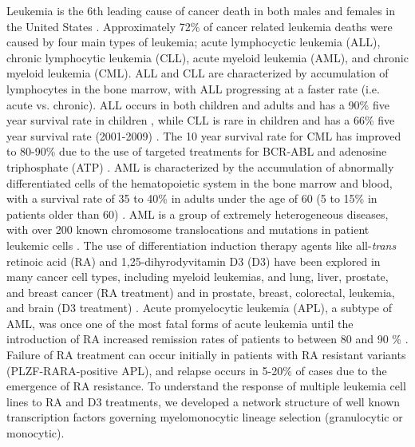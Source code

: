 \documentclass[12pt]{article}
\begin{document}
Leukemia is the 6th leading cause of cancer death in both males and females in the United States \cite{Siegel2015}. Approximately 72\% of cancer related leukemia deaths were caused by four main types of leukemia; acute lymphocyctic leukemia (ALL), chronic lymphocytic leukemia (CLL), acute myeloid leukemia (AML), and chronic myeloid leukemia (CML). ALL and CLL are characterized by accumulation of lymphocytes in the bone marrow, with ALL progressing at a faster rate (i.e. acute vs. chronic). ALL occurs in both children and adults and has a 90\% five year survival rate in children \cite{Hunger2015}, while CLL is rare in children and has a 66\% five year survival rate (2001-2009) \cite{Nabhan2014}.
The 10 year survival rate for CML has improved to 80-90\% due to the use of targeted treatments for BCR-ABL and adenosine triphosphate (ATP) \cite{Jabbour2014}.  
AML is characterized by the accumulation of abnormally differentiated cells of the hematopoietic system in the bone marrow and blood, with a survival rate of 35 to 40\% in adults under the age of 60 (5 to 15\% in patients older than 60) \cite{Dohner2015}.
AML is a group of extremely heterogeneous diseases, with over 200 known chromosome translocations and mutations in patient leukemic cells \cite{Gocek2012}.
The use of differentiation induction therapy agents like all-\textit{trans} retinoic acid (RA) and 1,25-dihyrodyvitamin D3 (D3) have been explored in many cancer cell types, including myeloid leukemias, and lung, liver, prostate, and breast cancer (RA treatment) \cite{Bushue2010,Tang2011} and in prostate, breast, colorectal, leukemia, and brain (D3 treatment) \cite{Cheung2012}.
Acute promyelocytic leukemia (APL), a subtype of AML, was once one of the most fatal forms of acute leukemia until the introduction of RA increased remission rates of patients to between 80 and 90 \% \cite{Coombs2015}.  
Failure of RA treatment can occur initially in patients with RA resistant variants (PLZF-RARA-positive APL), and relapse occurs in 5-20\% of cases due to the emergence of RA resistance.
To understand the response of multiple leukemia cell lines to RA and D3 treatments, we developed a network structure of well known transcription factors governing myelomonocytic lineage selection (granulocytic or monocytic). 
\end{document}
